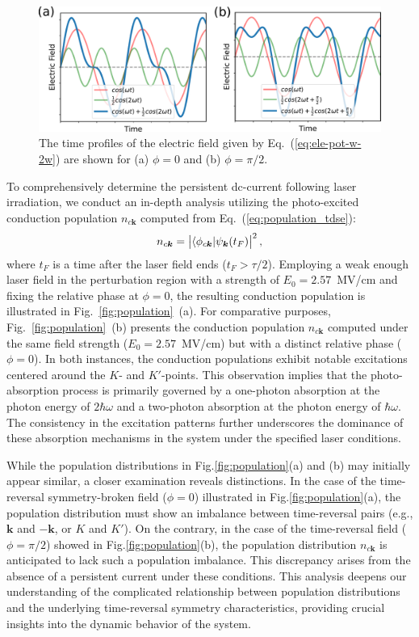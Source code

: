 \begin{figure}[htbp]
 \includegraphics[width=1.0\linewidth]{pic/electric.pdf}
\caption{\label{fig:electricfield} 
The time profiles of the electric field given by Eq.~(\ref{eq:ele-pot-w-2w}) are shown for (a) $\phi=0$ and (b) $\phi=\pi/2$.}
\end{figure}


To comprehensively determine the persistent dc-current following laser irradiation, we conduct an in-depth analysis utilizing the photo-excited conduction population $n_{c\mathbf{k}}$ computed from Eq.~(\ref{eq:population_tdse}): 
\begin{align}
n_{c\boldsymbol{k}} = \left | \langle \phi_{c \boldsymbol{k}} | \psi_{\boldsymbol{k}}(t_F) \right |^2,
\end{align}
where $t_F$ is a time after the laser field ends ($t_F>\tau/2$).
Employing a weak enough laser field in the perturbation region with a strength of $E_0=2.57$~MV/cm and fixing the relative phase at $\phi=0$, the resulting conduction population is illustrated in Fig.~\ref{fig:population}~(a). For comparative purposes, Fig.~\ref{fig:population}~(b) presents the conduction population $n_{c\mathbf{k}}$ computed under the same field strength ($E_0=2.57$~MV/cm) but with a distinct relative phase ($\phi=0$). In both instances, the conduction populations exhibit notable excitations centered around the $K$- and $K'$-points. This observation implies that the photo-absorption process is primarily governed by a one-photon absorption at the photon energy of $2\hbar \omega$ and a two-photon absorption at the photon energy of $\hbar \omega$. The consistency in the excitation patterns further underscores the dominance of these absorption mechanisms in the system under the specified laser conditions.


While the population distributions in Fig.\ref{fig:population}(a) and (b) may initially appear similar, a closer examination reveals distinctions. In the case of the time-reversal symmetry-broken field ($\phi=0$) illustrated in Fig.\ref{fig:population}(a), the population distribution must show an imbalance between time-reversal pairs (e.g., $\mathbf{k}$ and $-\mathbf{k}$, or $K$ and $K'$). On the contrary, in the case of the time-reversal field ($\phi=\pi/2$) showed in Fig.\ref{fig:population}(b), the population distribution $n_{c\mathbf{k}}$ is anticipated to lack such a population imbalance. This discrepancy arises from the absence of a persistent current under these conditions. This analysis deepens our understanding of the complicated relationship between population distributions and the underlying time-reversal symmetry characteristics, providing crucial insights into the dynamic behavior of the system.

